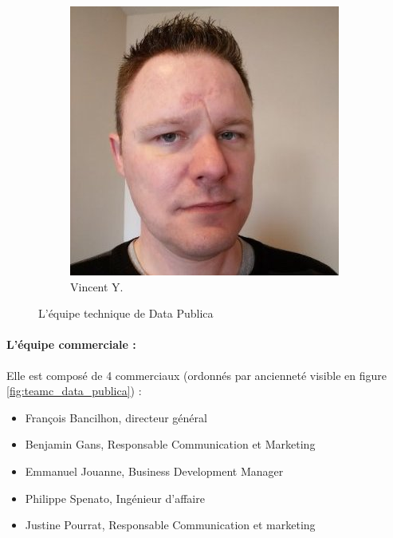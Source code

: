 \begin{figure}[h!]
\begin{subfigure}[b]{0.2\textwidth}
                \includegraphics[width=\textwidth]{images/vincent.jpg}
                \caption{Vincent Y.}
            \end{subfigure}
            \caption{L'équipe technique de Data Publica}
            \label{fig:teamd_data_publica}
        \end{figure}

\newpage

        \paragraph{L'équipe commerciale :}
            Elle est composé de 4 commerciaux (ordonnés par ancienneté visible en figure \ref{fig:teamc_data_publica}) :
            \begin{itemize}
                \item François Bancilhon, directeur général
                \item Benjamin Gans, Responsable Communication et Marketing
                \item Emmanuel Jouanne, Business Development Manager
                \item Philippe Spenato, Ingénieur d'affaire
                \item Justine Pourrat, Responsable Communication et marketing
            \end{itemize}

